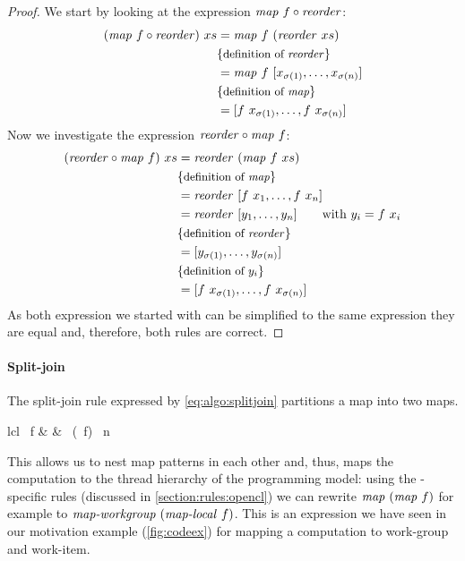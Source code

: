 \begin{proof}
  We start by looking at the expression $\text{\textit{map}}\ f \circ \text{\textit{reorder}}$:
  \begin{align*}
    (\text{\textit{map}}\ f \circ \text{\textit{reorder}})\ xs
      &= \text{\textit{map}}\ f\ (\text{\textit{reorder}}\ xs)\\
      & \{\text{\small definition of \text{\textit{reorder}}}\}\\
      &= \text{\textit{map}}\ f\ [x_{\sigma(1)}, \ldots, x_{\sigma(n)}]\\
      & \{\text{\small definition of \text{\textit{map}}}\}\\
      &= [f\ x_{\sigma(1)}, \ldots, f\ x_{\sigma(n)}]
  \end{align*}
  Now we investigate the expression $\text{\textit{reorder}} \circ \text{\textit{map}}\ f$:
  \begin{align*}
    (\reorder \circ \map\ f)\ xs
      &= \reorder\ (\map\ f\ xs)\\
      & \comment{definition of \map}\\
      &= \reorder\ [f\ x_1, \ldots, f\ x_n]\\
      &= \reorder\ [y_1, \ldots, y_n]\qquad \text{with } y_i = f\ x_i\\
      & \comment{definition of \reorder}\\
      &= [y_{\sigma(1)}, \dots, y_{\sigma(n)}]\\
      & \comment{definition of $y_i$}\\
      &= [f\ x_{\sigma(1)}, \ldots, f\ x_{\sigma(n)}]
  \end{align*}
  As both expression we started with can be simplified to the same expression they are equal and, therefore, both rules are correct.
\end{proof}

\paragraph{Split-join}
The split-join rule expressed by \autoref{eq:algo:splitjoin} partitions a map into two maps.
%
\begin{rerule}{lcl}
  \map\ f
    & \rightarrow &
      \join \circ \map\ (\map\ f) \circ \splitN\ n
  \label{eq:algo:splitjoin}
\end{rerule}
%
This allows us to nest map patterns in each other and, thus, maps the computation to the thread hierarchy of the \OpenCL programming model:
using the \OpenCL-specific rules (discussed in \autoref{section:rules:opencl}) we can rewrite $\text{\textit{map}}\ (\text{\textit{map}}\ f)$ for example to $\text{\textit{map-workgroup}}\ (\text{\textit{map-local}}\ f)$.
This is an expression we have seen in our motivation example (\autoref{fig:codeex}) for mapping a computation to \OpenCL work-group and work-item.

